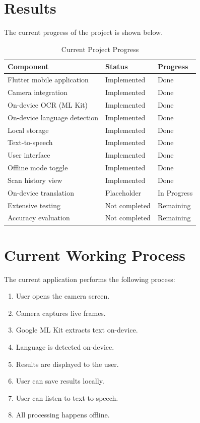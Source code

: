 \documentclass[12pt,a4paper]{report}
\begin{document}
\section{Results}

The current progress of the project is shown below.

\begin{table}[H]
\centering
\caption{Current Project Progress}
\begin{tabular}{|p{6cm}|p{3cm}|p{3cm}|}
\hline
\textbf{Component} & \textbf{Status} & \textbf{Progress} \\ \hline
Flutter mobile application & Implemented & Done \\ \hline
Camera integration & Implemented & Done \\ \hline
On-device OCR (ML Kit) & Implemented & Done \\ \hline
On-device language detection & Implemented & Done \\ \hline
Local storage & Implemented & Done \\ \hline
Text-to-speech & Implemented & Done \\ \hline
User interface & Implemented & Done \\ \hline
Offline mode toggle & Implemented & Done \\ \hline
Scan history view & Implemented & Done \\ \hline
On-device translation & Placeholder & In Progress \\ \hline
Extensive testing & Not completed & Remaining \\ \hline
Accuracy evaluation & Not completed & Remaining \\ \hline
\end{tabular}
\end{table}

\section{Current Working Process}

The current application performs the following process:

\begin{enumerate}
    \item User opens the camera screen.
    \item Camera captures live frames.
    \item Google ML Kit extracts text on-device.
    \item Language is detected on-device.
    \item Results are displayed to the user.
    \item User can save results locally.
    \item User can listen to text-to-speech.
    \item All processing happens offline.
\end{enumerate}
\end{document}
